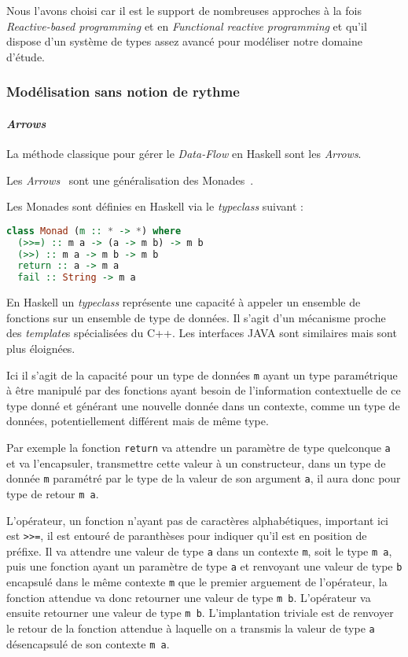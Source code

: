\documentclass{llncs}
\newcommand{\DF}{\emph{Data-Flow} }
\newcommand{\RP}{\emph{Reactive-based programming} }
\newcommand{\FRP}{\emph{Functional reactive programming} }
\begin{document}
Nous l'avons choisi car il est le support de nombreuses approches à la fois \RP
et en \FRP et qu'il dispose d'un système de types assez avancé pour modéliser
notre domaine d'étude.

\subsubsection{Modélisation sans notion de rythme}
\paragraph{\emph{Arrows}}
La méthode classique pour gérer le \DF en Haskell sont les \emph{Arrows}.

Les \emph{Arrows}~\cite{Hughes00} sont une généralisation des Monades~\cite{Wadler90}.

Les Monades sont définies en Haskell via le \emph{typeclass} suivant :
\begin{lstlisting}[language=haskell]
class Monad (m :: * -> *) where
  (>>=) :: m a -> (a -> m b) -> m b
  (>>) :: m a -> m b -> m b
  return :: a -> m a
  fail :: String -> m a
\end{lstlisting}

En Haskell un \emph{typeclass} représente une capacité à appeler un ensemble
de fonctions sur un ensemble de type de données.
Il s'agit d'un mécanisme proche des \emph{template}s spécialisées du C++.
Les interfaces JAVA sont similaires mais sont plus éloignées.

Ici il s'agit de la capacité pour un type de données \texttt{m} ayant un type
paramétrique à être manipulé par des fonctions ayant besoin de l'information
contextuelle de ce type donné et générant une nouvelle donnée dans un contexte,
comme un type de données, potentiellement différent mais de même type.

Par exemple la fonction \texttt{return} va attendre un paramètre de type quelconque
\texttt{a} et va l'encapsuler, transmettre cette valeur à un constructeur, dans
un type de donnée \texttt{m} paramétré par le type de la valeur de son argument
\texttt{a}, il aura donc pour type de retour \texttt{m a}.

L'opérateur, un fonction n'ayant pas de caractères alphabétiques, important ici
est \texttt{>>=}, il est entouré de paranthèses pour indiquer qu'il est en
position de préfixe.
Il va attendre une valeur de type \texttt{a} dans un contexte \texttt{m}, soit
le type \texttt{m a}, puis une fonction ayant un paramètre de type \texttt{a}
et renvoyant une valeur de type \texttt{b} encapsulé dans le même contexte \texttt{m}
que le premier arguement de l'opérateur, la fonction attendue va donc retourner
une valeur de type \texttt{m b}. L'opérateur va ensuite retourner une valeur de
type \texttt{m b}.
L'implantation triviale est de renvoyer le retour de la fonction attendue à
laquelle on a transmis la valeur de type \texttt{a} désencapsulé de son contexte
\texttt{m a}.
\end{document}
